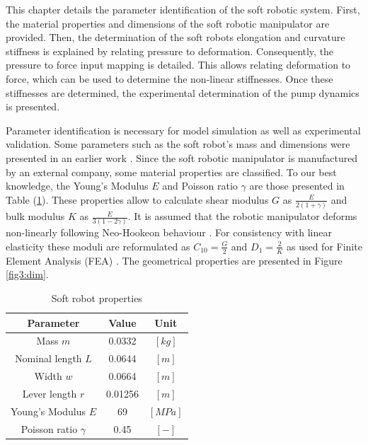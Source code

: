 \label{chap3}

This chapter details the parameter identification of the soft robotic system. First, the material properties and dimensions of the soft robotic manipulator are provided. Then, the determination of the soft robots elongation and curvature stiffness is explained by relating pressure to deformation. Consequently, the pressure to force input mapping is detailed. This allows relating deformation to force, which can be used to determine the non-linear stiffnesses. Once these stiffnesses are determined, the experimental determination of the pump dynamics is presented. 


Parameter identification is necessary for model simulation as well as experimental validation. Some parameters such as the soft robot's mass and dimensions were presented in an earlier work \cite{berkers}. Since the soft robotic manipulator is manufactured by an external company, some material properties are classified. To our best knowledge, the Young's Modulus $E$ and Poisson ratio $\gamma$ are those presented in Table (\ref{tab4:parameters}). These properties allow to calculate shear modulus $G$ as $\frac{E}{2(1+\gamma)}$ and bulk modulus $K$ as $\frac{E}{3(1-2\gamma)}$. It is assumed that the robotic manipulator deforms non-linearly following Neo-Hookeon behaviour \cite{Caasenbrood2020StiffnessModel}. For consistency with linear elasticity these moduli are reformulated as $C_{10} = \frac{G}{2}$ and $D_{1} = \frac{2}{K}$ as used for Finite Element Analysis (FEA) \cite{neohookean}. The geometrical properties are presented in Figure \ref{fig3:dim}.


\begin{table}[H]
    \centering
    \caption{Soft robot properties}
    \begin{tabular}{|c|c|c|} \hline
      \textbf{Parameter}   &  \textbf{Value} & \textbf{Unit} \\ \hline
      Mass $m$             &    0.0332       & $[kg]$ \\ 
      Nominal length $L$ &    0.0644       & $[m]$  \\ 
      Width  $w$     &    0.0664    & $[m]$  \\
      Lever length $r$     &    0.01256      & $[m]$  \\ 
      Young's Modulus $E$  &    69           & $[MPa]$\\ 
      Poisson ratio $\gamma$ &    0.45          & $[-]$ \\ \hline
    \end{tabular}
    \label{tab4:parameters}
\end{table}

